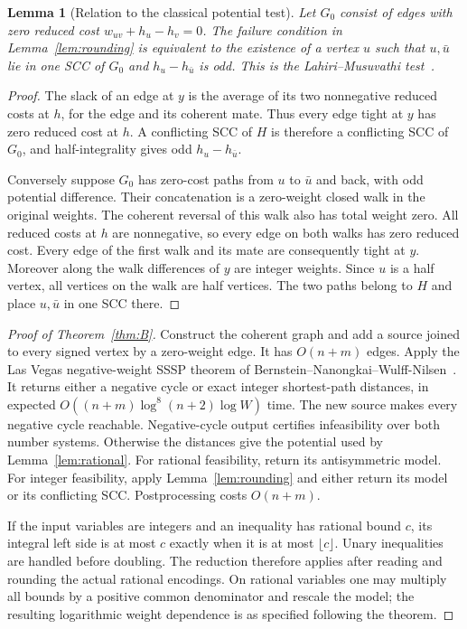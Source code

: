 \documentclass[manuscript,11pt,screen,nonacm]{acmart}
\newtheorem{lemma}[theorem]{Lemma}
\theoremstyle{definition}
\begin{document}
\begin{lemma}[Relation to the classical potential test]\label{lem:lm}
Let $G_0$ consist of edges with zero reduced cost $w_{uv}+h_u-h_v=0$. The failure condition in Lemma~\ref{lem:rounding} is equivalent to the existence of a vertex $u$ such that $u,\bar u$ lie in one SCC of $G_0$ and $h_u-h_{\bar u}$ is odd. This is the Lahiri--Musuvathi test~\cite{lm2005}.
\end{lemma}
\begin{proof}
The slack of an edge at $y$ is the average of its two nonnegative reduced costs at $h$, for the edge and its coherent mate. Thus every edge tight at $y$ has zero reduced cost at $h$. A conflicting SCC of $H$ is therefore a conflicting SCC of $G_0$, and half-integrality gives odd $h_u-h_{\bar u}$.

Conversely suppose $G_0$ has zero-cost paths from $u$ to $\bar u$ and back, with odd potential difference. Their concatenation is a zero-weight closed walk in the original weights. The coherent reversal of this walk also has total weight zero. All reduced costs at $h$ are nonnegative, so every edge on both walks has zero reduced cost. Every edge of the first walk and its mate are consequently tight at $y$. Moreover along the walk differences of $y$ are integer weights. Since $u$ is a half vertex, all vertices on the walk are half vertices. The two paths belong to $H$ and place $u,\bar u$ in one SCC there.
\end{proof}

\begin{proof}[Proof of Theorem~\ref{thm:B}]
Construct the coherent graph and add a source joined to every signed vertex by a zero-weight edge. It has $O(n+m)$ edges. Apply the Las Vegas negative-weight SSSP theorem of Bernstein--Nanongkai--Wulff-Nilsen~\cite[Theorem 1.1]{bnw2022}. It returns either a negative cycle or exact integer shortest-path distances, in expected $O((n+m)\log^8(n+2)\log W)$ time. The new source makes every negative cycle reachable. Negative-cycle output certifies infeasibility over both number systems. Otherwise the distances give the potential used by Lemma~\ref{lem:rational}. For rational feasibility, return its antisymmetric model. For integer feasibility, apply Lemma~\ref{lem:rounding} and either return its model or its conflicting SCC. Postprocessing costs $O(n+m)$.

If the input variables are integers and an inequality has rational bound $c$, its integral left side is at most $c$ exactly when it is at most $\lfloor c\rfloor$. Unary inequalities are handled before doubling. The reduction therefore applies after reading and rounding the actual rational encodings. On rational variables one may multiply all bounds by a positive common denominator and rescale the model; the resulting logarithmic weight dependence is as specified following the theorem.
\end{proof}
\end{document}

